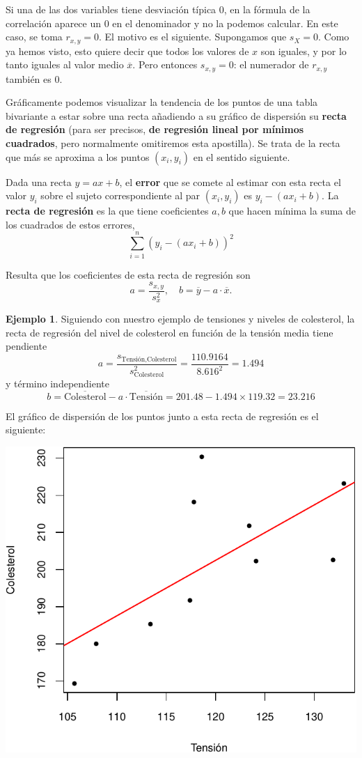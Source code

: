 \documentclass[
]{book}
\theoremstyle{definition}
\theoremstyle{definition}
\newtheorem{example}{Ejemplo}[chapter]
\theoremstyle{definition}
\theoremstyle{definition}
\theoremstyle{remark}
\begin{document}
\begin{rmdnote}
Si una de las dos variables tiene desviación típica 0, en la fórmula de la correlación aparece un 0 en el denominador y no la podemos calcular. En este caso, se toma \(r_{x,y}=0\). El motivo es el siguiente. Supongamos que \(s_X=0\). Como ya hemos visto, esto quiere decir que todos los valores de \(x\) son iguales, y por lo tanto iguales al valor medio \(\overline{x}\). Pero entonces \(s_{x,y}=0\): el numerador de \(r_{x,y}\) también es 0.
\end{rmdnote}

Gráficamente podemos visualizar la tendencia de los puntos de una tabla bivariante a estar sobre una recta añadiendo a su gráfico de dispersión su \textbf{recta de regresión} (para ser precisos, \textbf{de regresión lineal por mínimos cuadrados}, pero normalmente omitiremos esta apostilla). Se trata de la recta que más se aproxima a los puntos \((x_i,y_i)\) en el sentido siguiente.

Dada una recta \(y=ax+b\), el \textbf{error} que se comete al estimar con esta recta el valor \(y_i\) sobre el sujeto correspondiente al par \((x_i,y_i)\) es \(y_i-(ax_i+b)\).
La \textbf{recta de regresión} es la que tiene coeficientes \(a,b\) que hacen mínima la suma de los cuadrados de estos errores,
\[
\sum_{i=1}^n (y_i-(ax_i+b))^2
\]

Resulta que los coeficientes de esta recta de regresión son
\[
a=\frac{s_{x,y}}{s_x^2},\quad b = \overline{y}-a\cdot \overline{x}.
\]

\begin{example}
\protect\hypertarget{exm:unnamed-chunk-313}{}\label{exm:unnamed-chunk-313}Siguiendo con nuestro ejemplo de tensiones y niveles de colesterol, la recta de regresión del nivel de colesterol en función de la tensión media tiene pendiente
\[
  a=\frac{s_{\text{Tensión},\text{Colesterol}}}{s_{\text{Colesterol}}^2}=\frac{110.9164}{8.616^2}=1.494
\]
y término independiente
\[
b=  \overline{\text{Colesterol}}-a\cdot \overline{\text{Tensión}}=201.48-1.494\times 119.32=23.216
\]

El gráfico de dispersión de los puntos junto a esta recta de regresión es el siguiente:
\end{example}

\begin{center}\includegraphics[width=0.5\linewidth]{INREMDN_files/figure-latex/unnamed-chunk-314-1} \end{center}
\end{document}
